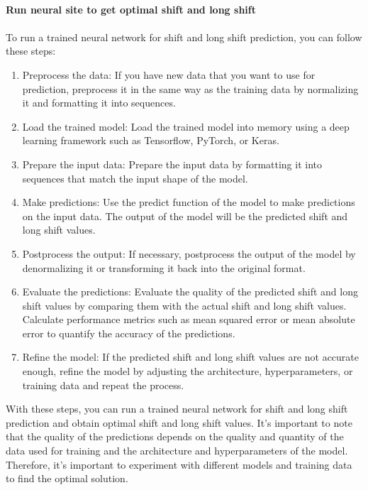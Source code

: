         \\
        \textbf{Run neural site to get optimal shift and long shift}\\
        \\
        To run a trained neural network for shift and long shift prediction, you can follow these steps:
        \begin{enumerate}
            \item Preprocess the data: If you have new data that you want to use for prediction, preprocess it in the same way as the training
            data by normalizing it and formatting it into sequences.
            \item Load the trained model: Load the trained model into memory using a deep learning framework such as Tensorflow, PyTorch, or Keras.
            \item Prepare the input data: Prepare the input data by formatting it into sequences that match the input shape of the model.
            \item Make predictions: Use the predict function of the model to make predictions on the input data. The output of the model will be the predicted
            shift and long shift values.
            \item Postprocess the output: If necessary, postprocess the output of the model by denormalizing it or transforming it back into the original format.
            \item Evaluate the predictions: Evaluate the quality of the predicted shift and long shift values by comparing them with the actual
            shift and long shift values. Calculate performance metrics such as mean squared error or mean absolute error to quantify the
            accuracy of the predictions.
            \item Refine the model: If the predicted shift and long shift values are not accurate enough, refine the model by
            adjusting the architecture, hyperparameters, or training data and repeat the process.
        \end{enumerate}
        With these steps, you can run a trained neural network for shift and long shift prediction and obtain optimal
        shift and long shift values. It's important to note that the quality of the predictions depends on the quality and
        quantity of the data used for training and the architecture and hyperparameters of the model. Therefore, it's important
        to experiment with different models and training data to find the optimal solution.
